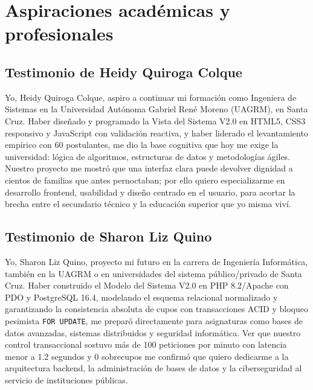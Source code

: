 \section{Aspiraciones académicas y profesionales}
\label{sec:aspiraciones_academicas}

\subsection{Testimonio de Heidy Quiroga Colque}
Yo, Heidy Quiroga Colque, aspiro a continuar mi formación como Ingeniera de Sistemas en la Universidad Autónoma Gabriel René Moreno (UAGRM), en Santa Cruz. Haber diseñado y programado la Vista del Sistema V2.0 en HTML5, CSS3 responsivo y JavaScript con validación reactiva, y haber liderado el levantamiento empírico con 60 postulantes, me dio la base cognitiva que hoy me exige la universidad: lógica de algoritmos, estructuras de datos y metodologías ágiles. Nuestro proyecto me mostró que una interfaz clara puede devolver dignidad a cientos de familias que antes pernoctaban; por ello quiero especializarme en desarrollo frontend, usabilidad y diseño centrado en el usuario, para acortar la brecha entre el secundario técnico y la educación superior que yo misma viví.

\subsection{Testimonio de Sharon Liz Quino}
Yo, Sharon Liz Quino, proyecto mi futuro en la carrera de Ingeniería Informática, también en la UAGRM o en universidades del sistema público/privado de Santa Cruz. Haber construido el Modelo del Sistema V2.0 en PHP 8.2/Apache con PDO y PostgreSQL 16.4, modelando el esquema relacional normalizado y garantizando la consistencia absoluta de cupos con transacciones ACID y bloqueo pesimista \texttt{FOR UPDATE}, me preparó directamente para asignaturas como bases de datos avanzadas, sistemas distribuidos y seguridad informática. Ver que nuestro control transaccional sostuvo más de 100 peticiones por minuto con latencia menor a 1.2 segundos y 0 sobrecupos me confirmó que quiero dedicarme a la arquitectura backend, la administración de bases de datos y la ciberseguridad al servicio de instituciones públicas.
